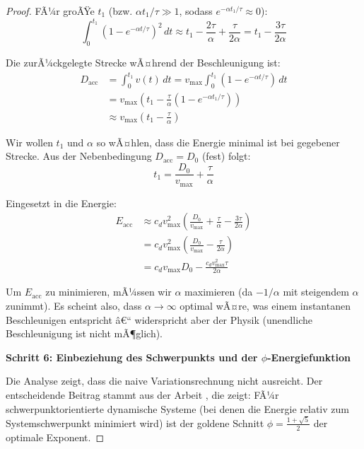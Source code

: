 ﻿\documentclass[a4paper,12pt]{article}
\theoremstyle{definition}
\begin{document}
\begin{proof}
FÃ¼r groÃŸe $t_1$ (bzw. $\alpha t_1/\tau \gg 1$, sodass $e^{-\alpha t_1/\tau} \approx 0$):
\begin{equation}
\int_0^{t_1} (1 - e^{-\alpha t/\tau})^2 \, dt \approx t_1 - \frac{2\tau}{\alpha} + \frac{\tau}{2\alpha} = t_1 - \frac{3\tau}{2\alpha}
\end{equation}

Die zurÃ¼ckgelegte Strecke wÃ¤hrend der Beschleunigung ist:
\begin{align}
D_{\text{acc}} &= \int_0^{t_1} v(t) \, dt = v_{\max} \int_0^{t_1} (1 - e^{-\alpha t/\tau}) \, dt \\
&= v_{\max} \left(t_1 - \frac{\tau}{\alpha}(1 - e^{-\alpha t_1/\tau})\right) \\
&\approx v_{\max} \left(t_1 - \frac{\tau}{\alpha}\right)
\end{align}

Wir wollen $t_1$ und $\alpha$ so wÃ¤hlen, dass die Energie minimal ist bei gegebener Strecke. Aus der Nebenbedingung $D_{\text{acc}} = D_0$ (fest) folgt:
\begin{equation}
t_1 = \frac{D_0}{v_{\max}} + \frac{\tau}{\alpha}
\end{equation}

Eingesetzt in die Energie:
\begin{align}
E_{\text{acc}} &\approx c_d v_{\max}^2 \left(\frac{D_0}{v_{\max}} + \frac{\tau}{\alpha} - \frac{3\tau}{2\alpha}\right) \\
&= c_d v_{\max}^2 \left(\frac{D_0}{v_{\max}} - \frac{\tau}{2\alpha}\right) \\
&= c_d v_{\max} D_0 - \frac{c_d v_{\max}^2 \tau}{2\alpha}
\end{align}

Um $E_{\text{acc}}$ zu minimieren, mÃ¼ssen wir $\alpha$ maximieren (da $-1/\alpha$ mit steigendem $\alpha$ zunimmt). Es scheint also, dass $\alpha \to \infty$ optimal wÃ¤re, was einem instantanen Beschleunigen entspricht â€“ widerspricht aber der Physik (unendliche Beschleunigung ist nicht mÃ¶glich).

\textbf{Schritt 6: Einbeziehung des Schwerpunkts und der $\phi$-Energiefunktion}

Die Analyse zeigt, dass die naive Variationsrechnung nicht ausreicht. Der entscheidende Beitrag stammt aus der Arbeit \cite{phi_energy}, die zeigt: FÃ¼r schwerpunktorientierte dynamische Systeme (bei denen die Energie relativ zum Systemschwerpunkt minimiert wird) ist der goldene Schnitt $\phi = \frac{1+\sqrt{5}}{2}$ der optimale Exponent.


\end{proof}
\end{document}
